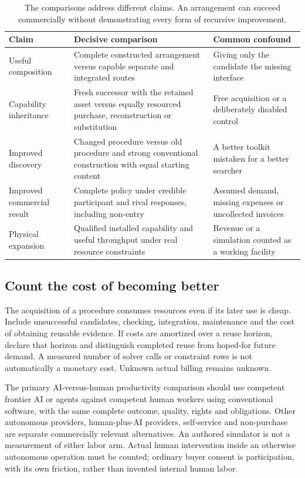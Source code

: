 \begin{table}[ht]
\small\centering
\begin{tabularx}{\linewidth}{@{}P{3.2cm}YY@{}}\toprule
Claim & Decisive comparison & Common confound\\\midrule
Useful composition & Complete constructed arrangement versus capable separate and integrated routes & Giving only the candidate the missing interface\\
Capability inheritance & Fresh successor with the retained asset versus equally resourced purchase, reconstruction or substitution & Free acquisition or a deliberately disabled control\\
Improved discovery & Changed procedure versus old procedure and strong conventional construction with equal starting content & A better toolkit mistaken for a better searcher\\
Improved commercial result & Complete policy under credible participant and rival responses, including non-entry & Assumed demand, missing expenses or uncollected invoices\\
Physical expansion & Qualified installed capability and useful throughput under real resource constraints & Revenue or a simulation counted as a working facility\\\bottomrule
\end{tabularx}
\caption{The comparisons address different claims. An arrangement can succeed commercially without demonstrating every form of recursive improvement.}
\label{tab:claims}
\end{table}

\subsection{Count the cost of becoming better}
The acquisition of a procedure consumes resources even if its later use is cheap. Include unsuccessful candidates, checking, integration, maintenance and the cost of obtaining reusable evidence. If costs are amortized over a reuse horizon, declare that horizon and distinguish completed reuse from hoped-for future demand. A measured number of solver calls or constraint rows is not automatically a monetary cost. Unknown actual billing remains unknown.

The primary AI-versus-human productivity comparison should use competent frontier AI or agents against competent human workers using conventional software, with the same complete outcome, quality, rights and obligations. Other autonomous providers, human-plus-AI providers, self-service and non-purchase are separate commercially relevant alternatives. An authored simulator is not a measurement of either labor arm. Actual human intervention inside an otherwise autonomous operation must be counted; ordinary buyer consent is participation, with its own friction, rather than invented internal human labor.

